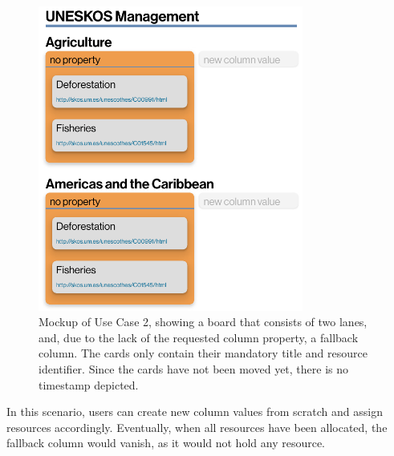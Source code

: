 \begin{figure}[ht]
    \libertineLF
    \centering
    \includegraphics[width=87mm]{img/31-UseCase2.pdf}
	\caption[ Mockup of Use Case 2]{ Mockup of Use Case 2, showing a board that consists of two lanes, and, due to the lack of the requested column property, a fallback column. The cards only contain their mandatory title and resource identifier. Since the cards have not been moved yet, there is no timestamp depicted.}
	\label{fig:RMB Use Case 2}
	\libertineOsF
\end{figure}



\noindent In this scenario, users can create new column values from scratch and assign resources accordingly. Eventually, when all resources have been allocated, the fallback column would vanish, as it would not hold any resource.